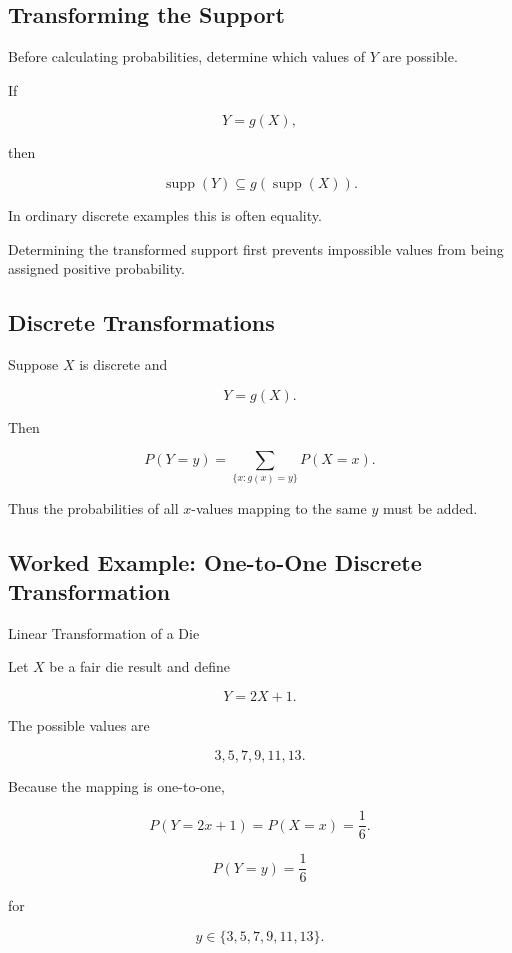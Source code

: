 \subsection{Transforming the Support}
\label{subsec:function-transform-support}

Before calculating probabilities, determine which values of \(Y\) are
possible.

If

\[
Y=g(X),
\]

then

\[
\boxed{
\operatorname{supp}(Y)
\subseteq
g(\operatorname{supp}(X)).
}
\]

In ordinary discrete examples this is often equality.

Determining the transformed support first prevents impossible values
from being assigned positive probability.

\subsection{Discrete Transformations}
\label{subsec:discrete-transformations}

Suppose \(X\) is discrete and

\[
Y=g(X).
\]

Then

\[
\boxed{
P(Y=y)
=
\sum_{\{x:g(x)=y\}}
P(X=x).
}
\]

Thus the probabilities of all \(x\)-values mapping to the same \(y\)
must be added.

\subsection{Worked Example: One-to-One Discrete Transformation}
\label{subsec:worked-one-to-one-discrete}

\begin{workedexamplebox}{Linear Transformation of a Die}

Let \(X\) be a fair die result and define

\[
Y=2X+1.
\]

The possible values are

\[
3,5,7,9,11,13.
\]

Because the mapping is one-to-one,

\[
P(Y=2x+1)
=
P(X=x)
=
\frac16.
\]

\begin{answerbox}
\[
\boxed{
P(Y=y)=\frac16
}
\]

for

\[
y\in\{3,5,7,9,11,13\}.
\]
\end{answerbox}

\end{workedexamplebox}

